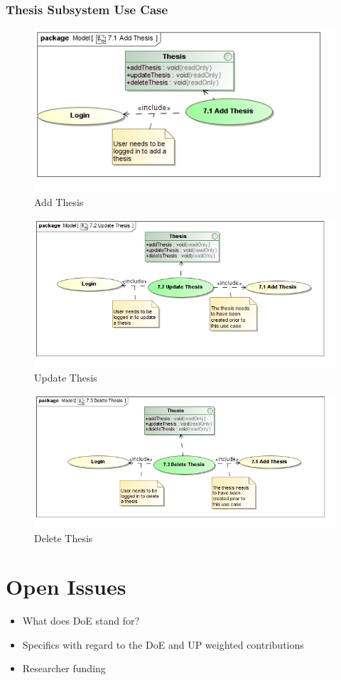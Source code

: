 \documentclass{article}
\begin{document}
			\subsubsection{Thesis Subsystem Use Case}
				\begin{figure}
					\includegraphics[width=\textwidth]{5.3-SS5-7/Add-Thesis}
					\caption{Add Thesis}
				\end{figure}
				\begin{figure}
					\includegraphics[width=\textwidth]{5.3-SS5-7/Update-Thesis}
					\caption{Update Thesis}
				\end{figure}
				\begin{figure}
					\includegraphics[width=\textwidth]{5.3-SS5-7/Delete-Thesis}
					\caption{Delete Thesis}
				\end{figure}

	\section{Open Issues}
	\begin{itemize}
		\item What does DoE stand for?
		\item Specifics with regard to the DoE and UP weighted contributions
		\item Researcher funding
	\end{itemize}
\end{document}
